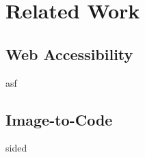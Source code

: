 \chapter{Related Work}\label{chapter:RelatedWork}

\section{Web Accessibility}
asf

\section{Image-to-Code}
sided

